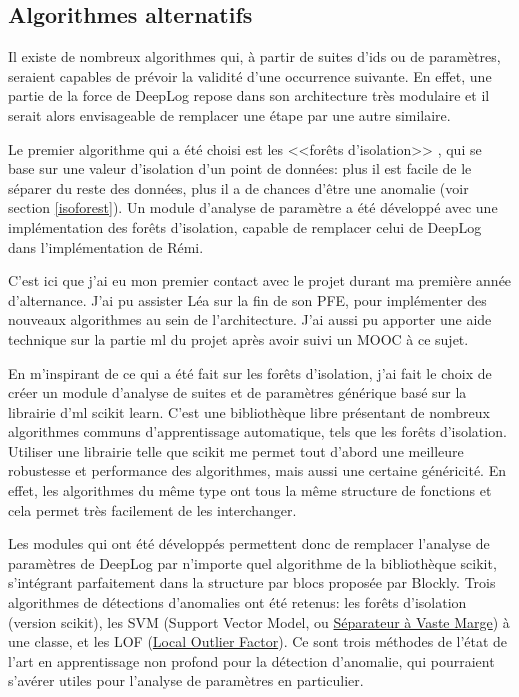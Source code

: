 \documentclass[openany, 11pt]{memoir}
\begin{document}
\subsection{Algorithmes alternatifs}

Il existe de nombreux algorithmes qui, à partir de suites d'ids ou de paramètres, seraient capables de prévoir la validité d'une occurrence suivante. En effet, une partie de la force de DeepLog repose dans son architecture très modulaire et il serait alors envisageable de remplacer une étape par une autre similaire.

Le premier algorithme qui a été choisi est les <<forêts d'isolation>> \cite{isolationforest}, qui se base sur une valeur d'isolation d'un point de données: plus il est facile de le séparer du reste des données, plus il a de chances d'être une anomalie (voir section \ref{isoforest}). Un module d'analyse de paramètre a été développé avec une implémentation des forêts d'isolation, capable de remplacer celui de DeepLog dans l'implémentation de Rémi.

\bigskip
C'est ici que j'ai eu mon premier contact avec le projet durant ma première année d'alternance. J'ai pu assister Léa sur la fin de son PFE, pour implémenter des nouveaux algorithmes au sein de l'architecture. J'ai aussi pu apporter une aide technique sur la partie \gls{ml} du projet après avoir suivi un MOOC à ce sujet.

En m'inspirant de ce qui a été fait sur les forêts d'isolation, j'ai fait le choix de créer un module d'analyse de suites et de paramètres générique basé sur la librairie d'\gls{ml} scikit learn. C'est une bibliothèque libre présentant de nombreux algorithmes communs d'apprentissage automatique, tels que les forêts d'isolation. Utiliser une librairie telle que scikit me permet tout d'abord une meilleure robustesse et performance des algorithmes, mais aussi une certaine généricité. En effet, les algorithmes du même type ont tous la même structure de fonctions et cela permet très facilement de les interchanger.

Les modules qui ont été développés permettent donc de remplacer l'analyse de paramètres de DeepLog par n'importe quel algorithme de la bibliothèque scikit, s'intégrant parfaitement dans la structure par blocs proposée par Blockly. Trois algorithmes de détections d'anomalies ont été retenus: les forêts d'isolation (version scikit), les SVM (Support Vector Model, ou \href{https://fr.wikipedia.org/wiki/Machine_à_vecteurs_de_support}{Séparateur à Vaste Marge}) à une classe, et les LOF (\href{https://en.wikipedia.org/wiki/Local_outlier_factor}{Local Outlier Factor}). Ce sont trois méthodes de l'état de l'art en apprentissage non profond pour la détection d'anomalie, qui pourraient s'avérer utiles pour l'analyse de paramètres en particulier.
\end{document}
